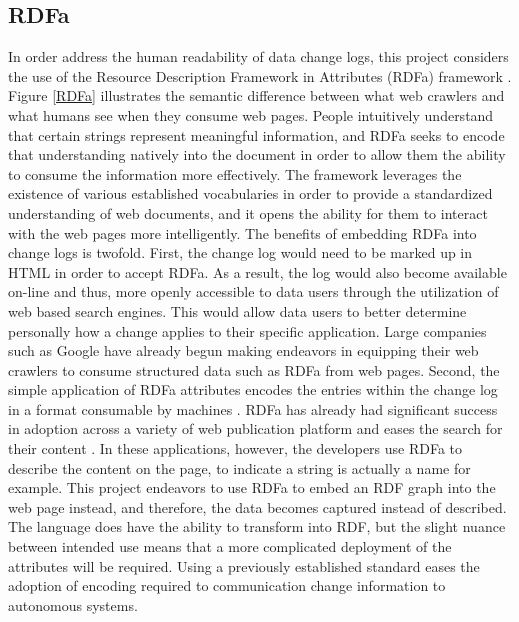 \subsection{RDFa}

In order address the human readability of data change logs, this project considers the use of the Resource Description Framework in Attributes (RDFa) framework \cite{Adida2015}.
Figure \ref{RDFa} illustrates the semantic difference between what web crawlers and what humans see when they consume web pages.
People intuitively understand that certain strings represent meaningful information, and RDFa seeks to encode that understanding natively into the document in order to allow them the ability to consume the information more effectively.
The framework leverages the existence of various established vocabularies in order to provide a standardized understanding of web documents, and it opens the ability for them to interact with the web pages more intelligently.
The benefits of embedding RDFa into change logs is twofold.
First, the change log would need to be marked up in HTML in order to accept RDFa.
As a result, the log would also become available on-line and thus, more openly accessible to data users through the utilization of web based search engines.
This would allow data users to better determine personally how a change applies to their specific application.
Large companies such as Google have already begun making endeavors in equipping their web crawlers to consume structured data such as RDFa from web pages.
Second, the simple application of RDFa attributes encodes the entries within the change log in a format consumable by machines \cite{Herman2015}.
RDFa has already had significant success in adoption across a variety of web publication platform and eases the search for their content \cite{Bizer2013}.
In these applications, however, the developers use RDFa to describe the content on the page, to indicate a string is actually a name for example.
This project endeavors to use RDFa to embed an RDF graph into the web page instead, and therefore, the data becomes captured instead of described.
The language does have the ability to transform into RDF, but the slight nuance between intended use means that a more complicated deployment of the attributes will be required.
Using a previously established standard eases the adoption of encoding required to communication change information to autonomous systems.

